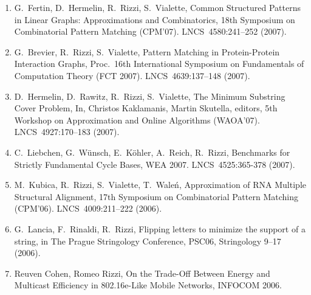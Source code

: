\documentclass[11pt]{article}
\begin{document}
\begin{enumerate}

  \item {G.~Fertin, D.~Hermelin, R.~Rizzi, S.~Vialette},
   \newblock Common Structured Patterns in Linear Graphs: Approximations and Combinatorics,
   \newblock 18th Symposium on Combinatorial Pattern Matching (CPM'07).
   \newblock LNCS~4580:241--252 (2007).

\vspace{-1.8mm}
  \item {G.~Brevier, R.~Rizzi, S.~Vialette},
   \newblock Pattern Matching in Protein-Protein Interaction Graphs,
   \newblock Proc.~16th International Symposium on Fundamentals
              of Computation Theory (FCT 2007).
   \newblock LNCS~4639:137--148 (2007).

\vspace{-1.8mm}
  \item {D.~Hermelin, D.~Rawitz, R.~Rizzi, S.~Vialette},
   \newblock The Minimum Substring Cover Problem,
   \newblock In, Christos Kaklamanis, Martin Skutella, editors,
   \newblock 5th Workshop on Approximation and Online Algorithms (WAOA'07).
   \newblock LNCS~4927:170--183 (2007).

\vspace{-1.8mm}
  \item {C.~Liebchen, G.~W\"unsch, E.~K\"ohler, A.~Reich, R.~Rizzi},
   \newblock Benchmarks for Strictly Fundamental Cycle Bases,
   \newblock WEA 2007.
   \newblock LNCS~4525:365-378 (2007).

\vspace{-1.8mm}
  \item {M.~Kubica, R.~Rizzi, S.~Vialette, T.~Wale\'n},
   \newblock Approximation of RNA Multiple Structural Alignment,
   \newblock 17th Symposium on Combinatorial Pattern Matching (CPM'06).
   \newblock LNCS~4009:211--222 (2006).

\vspace{-1.8mm}
  \item {G.~Lancia, F.~Rinaldi, R.~Rizzi},
   \newblock Flipping letters to minimize the support of a string,
   \newblock in The Prague Stringology Conference, PSC06,
   \newblock Stringology 9--17 (2006).

\vspace{-1.8mm}
  \item {\sc Reuven Cohen, Romeo Rizzi},
   \newblock   On the Trade-Off Between Energy and Multicast Efficiency in 802.16e-Like Mobile Networks,
   \newblock INFOCOM 2006.


\end{enumerate}
\end{document}
